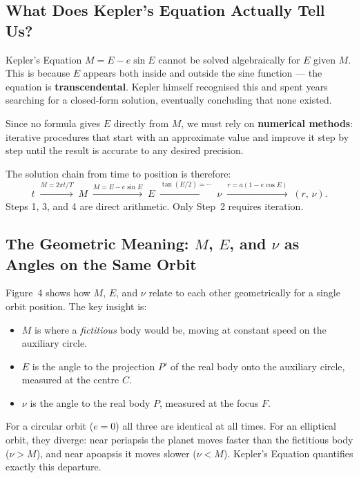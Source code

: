 \documentclass[12pt]{article}
\begin{document}
\subsection{What Does Kepler's Equation Actually Tell Us?}

Kepler's Equation $M = E - e\sin E$ cannot be solved algebraically for $E$ given
$M$. This is because $E$ appears both inside and outside the sine function --- the
equation is \textbf{transcendental}. Kepler himself recognised this and spent years
searching for a closed-form solution, eventually concluding that none existed.

Since no formula gives $E$ directly from $M$, we must rely on \textbf{numerical
methods}: iterative procedures that start with an approximate value and improve it
step by step until the result is accurate to any desired precision.

The solution chain from time to position is therefore:
\[
  t
  \;\xrightarrow{M = 2\pi t/T}\;
  M
  \;\xrightarrow{M = E - e\sin E}\;
  E
  \;\xrightarrow{\tan(E/2) = \cdots}\;
  \nu
  \;\xrightarrow{r = a(1-e\cos E)}\;
  (r,\,\nu).
\]
Steps 1, 3, and 4 are direct arithmetic. Only Step~2 requires iteration.

\subsection{The Geometric Meaning: $M$, $E$, and $\nu$ as Angles on the Same Orbit}

Figure~4 shows how $M$, $E$, and $\nu$ relate to each other geometrically for
a single orbit position. The key insight is:

\begin{itemize}
  \item $M$ is where a \emph{fictitious} body would be, moving at constant speed
        on the auxiliary circle.
  \item $E$ is the angle to the projection $P'$ of the real body onto the
        auxiliary circle, measured at the centre $C$.
  \item $\nu$ is the angle to the real body $P$, measured at the focus $F$.
\end{itemize}

For a circular orbit ($e = 0$) all three are identical at all times. For an
elliptical orbit, they diverge: near periapsis the planet moves faster than the
fictitious body ($\nu > M$), and near apoapsis it moves slower ($\nu < M$).
Kepler's Equation quantifies exactly this departure.
\end{document}
